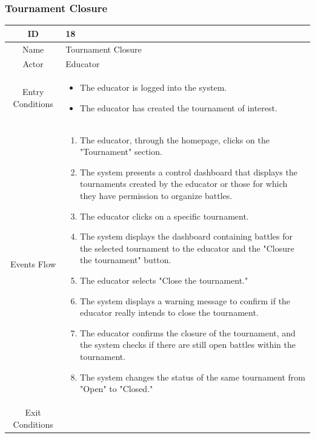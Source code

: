 \subsubsection{Tournament Closure}
\begin{longtable}{|c| p{10cm}|}
        \hline
            ID & 18 \\
        \hline
            Name & Tournament Closure \\
        \hline
            Actor & Educator\\
        \hline
            Entry Conditions &
            \begin{itemize}
                \item The educator is logged into the system.
                \item The educator has created the tournament of interest.
            \end{itemize}\\
        \hline
            Events Flow &   \begin{enumerate}
                            \item The educator, through the homepage, clicks on the "Tournament" section.
                            \item The system presents a control dashboard that displays the tournaments created by the educator or those for which they have permission to organize battles.
                            \item The educator clicks on a specific tournament.
                            \item The system displays the dashboard containing battles for the selected tournament to the educator and the "Closure the tournament" button.
                            \item The educator selects "Close the tournament."
                            \item The system displays a warning message to confirm if the educator really intends to close the tournament.
                            \item The educator confirms the closure of the tournament, and the system checks if there are still open battles within the tournament.
                            \item The system changes the status of the same tournament from "Open" to "Closed."
                            \end{enumerate} \\
                            \hline
            Exit Conditions &

\end{longtable}
